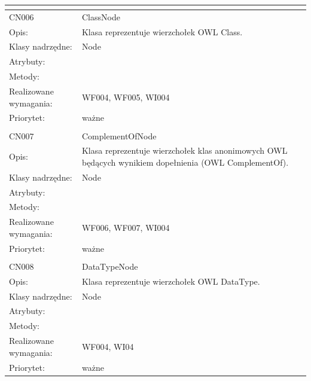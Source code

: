 \documentclass[a4paper,10pt]{article}
\begin{document}
\begin{center}
\begin{longtable}{|m{3cm}|m{9cm}|}
\multicolumn{2}{c}{} \\
 \hline

CN006 & ClassNode \\ \hline
Opis: & Klasa reprezentuje wierzchołek OWL Class.    \\ \hline
Klasy nadrzędne: & Node     \\ \hline
Atrybuty: & %
 \\ \hline
Metody: & %
  \\ \hline
Realizowane wymagania: & WF004, WF005, WI004 \\ \hline
Priorytet: & ważne  \\ \hline

\multicolumn{2}{c}{} \\
 \hline

CN007 & ComplementOfNode \\ \hline
Opis: & Klasa reprezentuje wierzchołek klas anonimowych OWL będących wynikiem dopełnienia (OWL ComplementOf).    \\ \hline
Klasy nadrzędne: & Node     \\ \hline
Atrybuty: & %
 \\ \hline
Metody: & %
  \\ \hline
Realizowane wymagania: & WF006, WF007, WI004 \\ \hline
Priorytet: & ważne  \\ \hline

\multicolumn{2}{c}{} \\
 \hline

CN008 & DataTypeNode \\ \hline
Opis: & Klasa reprezentuje wierzchołek OWL DataType.    \\ \hline
Klasy nadrzędne: & Node     \\ \hline
Atrybuty: & %
 \\ \hline
Metody: & %
  \\ \hline
Realizowane wymagania: & WF004, WI04 \\ \hline
Priorytet: & ważne  \\ \hline


\end{longtable}
\end{center}
\end{document}
